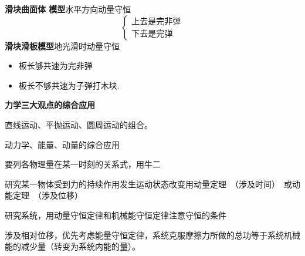 \textbf{滑块曲面体 模型}\quad 水平方向动量守恒
\[ \left\{\begin{array}{l}\text{上去是完非弹}\\[2pt] \text{下去是完弹}\end{array}\right. \]
\textbf{滑块滑板模型}\quad 地光滑时动量守恒
\begin{itemize}
\item 板长够共速为完非弹
\item 板长不够共速为子弹打木块.
\end{itemize}
\textbf{力学三大观点的综合应用}

直线运动、平抛运动、圆周运动的组合。

动力学、能量、动量的综合应用

要列各物理量在某一时刻的关系式，用牛二

研究某一物体受到力的持续作用发生运动状态改变\quad 用动量定理\ （涉及时间）\ 或动能定理\ （涉及位移） %

研究系统，用动量守恒定律和机械能守恒定律\quad 注意守恒的条件

涉及相对位移，优先考虑能量守恒定律，系统克服摩擦力所做的总功等于系统机械能的减少量（转变为系统内能的量）。

